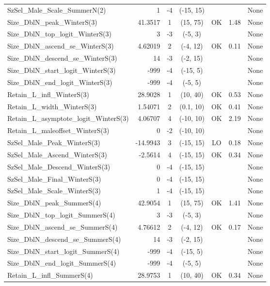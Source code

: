 \documentclass[12pt,]{article}
\begin{document}
\begin{landscape}
\begin{longtable}{lrcccll}
  SzSel\_Male\_Scale\_SummerN(2) & 1 & -4 & (-15, 15) &  &  & None \\ 
  Size\_DblN\_peak\_WinterS(3) & 41.3517 & 1 & (15, 75) & OK & 1.48 & None \\ 
  Size\_DblN\_top\_logit\_WinterS(3) & 3 & -3 & (-5, 3) &  &  & None \\ 
  Size\_DblN\_ascend\_se\_WinterS(3) & 4.62019 & 2 & (-4, 12) & OK & 0.11 & None \\ 
  Size\_DblN\_descend\_se\_WinterS(3) & 14 & -3 & (-2, 15) &  &  & None \\ 
  Size\_DblN\_start\_logit\_WinterS(3) & -999 & -4 & (-15, 5) &  &  & None \\ 
  Size\_DblN\_end\_logit\_WinterS(3) & -999 & -4 & (-5, 5) &  &  & None \\ 
  Retain\_L\_infl\_WinterS(3) & 28.9028 & 1 & (10, 40) & OK & 0.53 & None \\ 
  Retain\_L\_width\_WinterS(3) & 1.54071 & 2 & (0.1, 10) & OK & 0.41 & None \\ 
  Retain\_L\_asymptote\_logit\_WinterS(3) & 4.06707 & 4 & (-10, 10) & OK & 2.19 & None \\ 
  Retain\_L\_maleoffset\_WinterS(3) & 0 & -2 & (-10, 10) &  &  & None \\ 
  SzSel\_Male\_Peak\_WinterS(3) & -14.9943 & 3 & (-15, 15) & LO & 0.18 & None \\ 
  SzSel\_Male\_Ascend\_WinterS(3) & -2.5614 & 4 & (-15, 15) & OK & 0.34 & None \\ 
  SzSel\_Male\_Descend\_WinterS(3) & 0 & -4 & (-15, 15) &  &  & None \\ 
  SzSel\_Male\_Final\_WinterS(3) & 0 & -4 & (-15, 15) &  &  & None \\ 
  SzSel\_Male\_Scale\_WinterS(3) & 1 & -4 & (-15, 15) &  &  & None \\ 
  Size\_DblN\_peak\_SummerS(4) & 42.9054 & 1 & (15, 75) & OK & 1.41 & None \\ 
  Size\_DblN\_top\_logit\_SummerS(4) & 3 & -3 & (-5, 3) &  &  & None \\ 
  Size\_DblN\_ascend\_se\_SummerS(4) & 4.76612 & 2 & (-4, 12) & OK & 0.17 & None \\ 
  Size\_DblN\_descend\_se\_SummerS(4) & 14 & -3 & (-2, 15) &  &  & None \\ 
  Size\_DblN\_start\_logit\_SummerS(4) & -999 & -4 & (-15, 5) &  &  & None \\ 
  Size\_DblN\_end\_logit\_SummerS(4) & -999 & -4 & (-5, 5) &  &  & None \\ 
  Retain\_L\_infl\_SummerS(4) & 28.9753 & 1 & (10, 40) & OK & 0.34 & None \\ 

\end{longtable}
\end{landscape}
\end{document}
